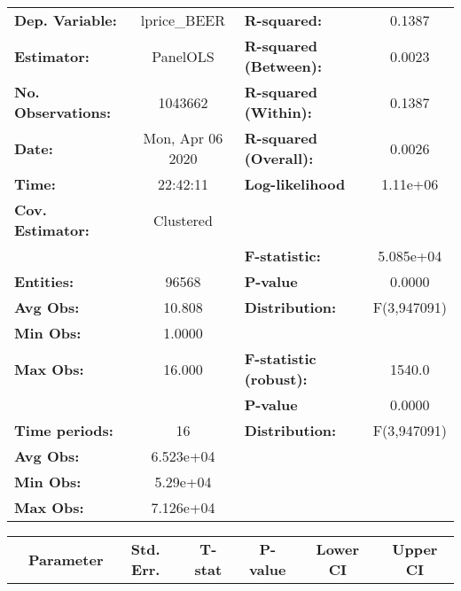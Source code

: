 \documentclass{report}
\begin{document}
\begin{center}
\begin{tabular}{lclc}
\toprule
\textbf{Dep. Variable:}    &    lprice\_BEER    & \textbf{  R-squared:         }   &      0.1387      \\
\textbf{Estimator:}        &      PanelOLS      & \textbf{  R-squared (Between):}  &      0.0023      \\
\textbf{No. Observations:} &      1043662       & \textbf{  R-squared (Within):}   &      0.1387      \\
\textbf{Date:}             &  Mon, Apr 06 2020  & \textbf{  R-squared (Overall):}  &      0.0026      \\
\textbf{Time:}             &      22:42:11      & \textbf{  Log-likelihood     }   &     1.11e+06     \\
\textbf{Cov. Estimator:}   &     Clustered      & \textbf{                     }   &                  \\
\textbf{}                  &                    & \textbf{  F-statistic:       }   &    5.085e+04     \\
\textbf{Entities:}         &       96568        & \textbf{  P-value            }   &      0.0000      \\
\textbf{Avg Obs:}          &       10.808       & \textbf{  Distribution:      }   &   F(3,947091)    \\
\textbf{Min Obs:}          &       1.0000       & \textbf{                     }   &                  \\
\textbf{Max Obs:}          &       16.000       & \textbf{  F-statistic (robust):} &      1540.0      \\
\textbf{}                  &                    & \textbf{  P-value            }   &      0.0000      \\
\textbf{Time periods:}     &         16         & \textbf{  Distribution:      }   &   F(3,947091)    \\
\textbf{Avg Obs:}          &     6.523e+04      & \textbf{                     }   &                  \\
\textbf{Min Obs:}          &      5.29e+04      & \textbf{                     }   &                  \\
\textbf{Max Obs:}          &     7.126e+04      & \textbf{                     }   &                  \\
\bottomrule
\end{tabular}
\begin{tabular}{lcccccc}
                           & \textbf{Parameter} & \textbf{Std. Err.} & \textbf{T-stat} & \textbf{P-value} & \textbf{Lower CI} & \textbf{Upper CI}  \\

\end{tabular}
\end{center}
\end{document}
